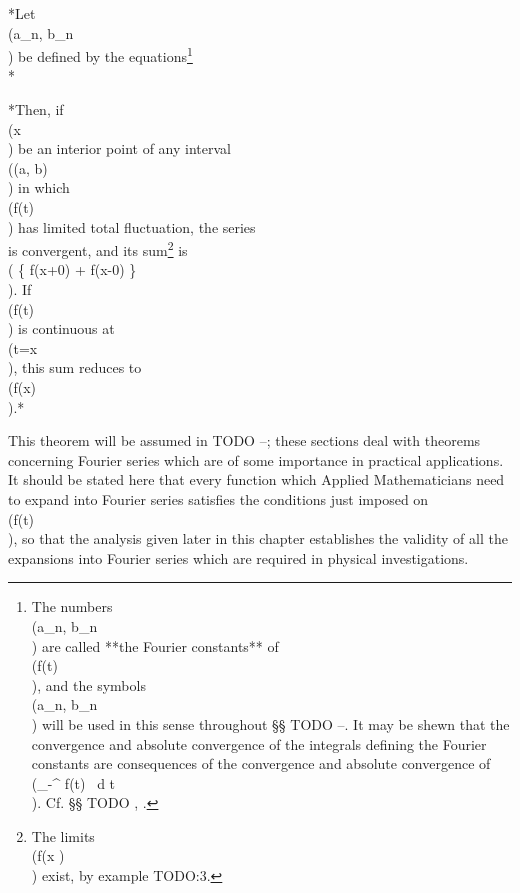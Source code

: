 *Let \\(a_{n}, b_{n}\\) be defined by the
  equations\footnote{The numbers \\(a_{n}, b_{n}\\) are called
    **the Fourier constants** of
    \\(f(t)\\), and the symbols \\(a_{n}, b_{n}\\) will be used in this sense throughout
    §§ TODO --.
    It may be shewn that the convergence and absolute convergence of the
    integrals defining the Fourier constants are consequences of the
    convergence and absolute convergence of
    \\(\int_{-\pi}^{\pi} f(t) \, d t\\).
    Cf. §§ TODO , .}
  \\[ 
  \pi a_{n} = \int_{-\pi}^{\pi}\! f(t) \cos nt \, d t,
  \quad
  \pi b_{n} = \int_{-\pi}^{\pi}\! f(t) \sin nt \, d t
  \quad
  (n=0,1,2,\ldots).
  \\]*

*Then, if \\(x\\) be an interior point of any interval \\((a, b)\\) in which
  \\(f(t)\\) has limited total fluctuation, the series
  \\[ 
  \frac{1}{2} a_{0}
  +
  \sum_{n=1}^{\infty} (a_{n} \cos nx + b_{n} \sin nx)
  \\] 
  is convergent, and its sum\footnote{The limits \\(f(x )\\) exist,
    by  example TODO:3.}
  is \\( \left\{  f(x+0) + f(x-0) \right\}\\).
  If \\(f(t)\\) is continuous at \\(t=x\\), this sum reduces to \\(f(x)\\).*

This theorem will be assumed in
TODO --;
these sections deal with theorems concerning Fourier series which
are of some importance
in practical applications. It should be stated here that every
function which Applied Mathematicians need to expand into Fourier
series satisfies the conditions just imposed on \\(f(t)\\), so that the
analysis given later in this chapter establishes the validity of all
the expansions into Fourier series which are required in physical
investigations.

